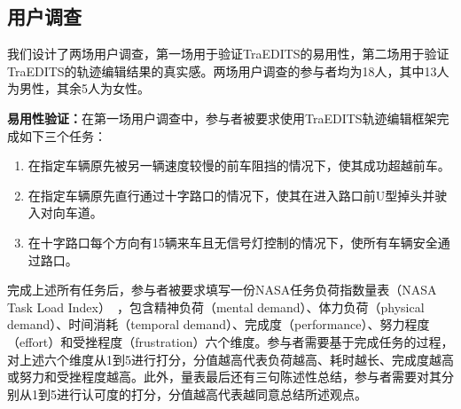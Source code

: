 \subsection{用户调查}
\label{section:traedits_userstudy}

我们设计了两场用户调查，第一场用于验证TraEDITS的易用性，第二场用于验证TraEDITS的轨迹编辑结果的真实感。两场用户调查的参与者均为18人，其中13人为男性，其余5人为女性。

\textbf{易用性验证：}在第一场用户调查中，参与者被要求使用TraEDITS轨迹编辑框架完成如下三个任务：

\begin{enumerate}
    \item 在指定车辆原先被另一辆速度较慢的前车阻挡的情况下，使其成功超越前车。

    \item 在指定车辆原先直行通过十字路口的情况下，使其在进入路口前U型掉头并驶入对向车道。

    \item 在十字路口每个方向有15辆来车且无信号灯控制的情况下，使所有车辆安全通过路口。
\end{enumerate}

完成上述所有任务后，参与者被要求填写一份NASA任务负荷指数量表（NASA Task Load Index）~\cite{hart1988development, hart2006nasa}，包含精神负荷（mental demand）、体力负荷（physical demand）、时间消耗（temporal demand）、完成度（performance）、努力程度（effort）和受挫程度（frustration）六个维度。参与者需要基于完成任务的过程，对上述六个维度从1到5进行打分，分值越高代表负荷越高、耗时越长、完成度越高或努力和受挫程度越高。此外，量表最后还有三句陈述性总结，参与者需要对其分别从1到5进行认可度的打分，分值越高代表越同意总结所述观点。



